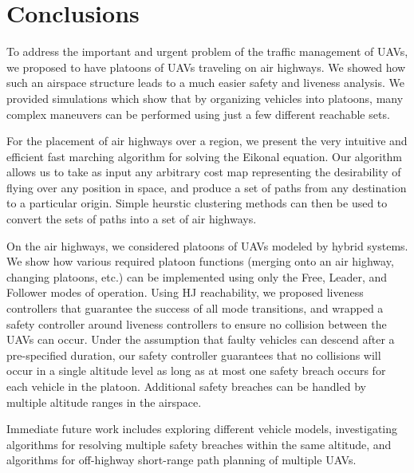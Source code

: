 \section{Conclusions}
To address the important and urgent problem of the traffic management of UAVs, we proposed to have platoons of UAVs traveling on air highways. We showed how such an airspace structure leads to a much easier safety and liveness analysis. We provided simulations which show that by organizing vehicles into platoons, many complex maneuvers can be performed using just a few different reachable sets.

For the placement of air highways over a region, we present the very intuitive and efficient fast marching algorithm for solving the Eikonal equation. Our algorithm allows us to take as input any arbitrary cost map representing the desirability of flying over any position in space, and produce a set of paths from any destination to a particular origin. Simple heurstic clustering methods can then be used to convert the sets of paths into a set of air highways.

On the air highways, we considered platoons of UAVs modeled by hybrid systems. We show how various required platoon functions (merging onto an air highway, changing platoons, etc.) can be implemented using only the Free, Leader, and Follower modes of operation. Using HJ reachability, we proposed liveness controllers that guarantee the success of all mode transitions, and wrapped a safety controller around liveness controllers to ensure no collision between the UAVs can occur. Under the assumption that faulty vehicles can descend after a pre-specified duration, our safety controller guarantees that no collisions will occur in a single altitude level as long as at most one safety breach occurs for each vehicle in the platoon. Additional safety breaches can be handled by multiple altitude ranges in the airspace. 

Immediate future work includes exploring different vehicle models, investigating algorithms for resolving multiple safety breaches within the same altitude, and algorithms for off-highway short-range path planning of multiple UAVs.